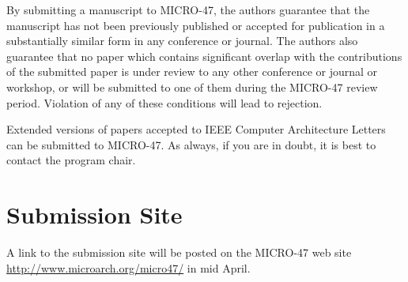 \documentclass[pageno]{jpaper}
\begin{document}
By submitting a manuscript to MICRO-47, the authors guarantee that the
manuscript has not been previously published or accepted for
publication in a substantially similar form in any conference or
journal. The authors also guarantee that no paper which contains
significant overlap with the contributions of the submitted paper is
under review to any other conference or journal or workshop, or will
be submitted to one of them during the MICRO-47 review
period. Violation of any of these conditions will lead to rejection.

Extended versions of papers accepted to IEEE Computer Architecture
Letters can be submitted to MICRO-47.
As always, if you are in doubt, it is best to contact the program chair. 

\section{Submission Site}

A link to the submission site will be posted on the MICRO-47 web site
\href{http://www.microarch.org/micro47/}{http://www.microarch.org/micro47/}
in mid April. 



\end{document}
